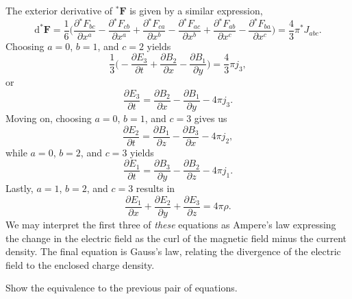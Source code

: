 \documentclass[../road-to-reality.tex]{subfiles}
\begin{document}
\begin{questions}
\begin{solution}
    The exterior derivative of ${}^*\mathbf{F}$ is given by a similar
    expression,
    \[
      \mathrm{d}^*\mathbf{F} = \frac{1}{6}\Big(\frac{\partial{^*F_{bc}}}{\partial{x^a}} -
      \frac{\partial{^*F_{cb}}}{\partial{x^a}} + \frac{\partial{^*F_{ca}}}{\partial{x^b}}
      - \frac{\partial{^*F_{ac}}}{\partial{x^b}} +
      \frac{\partial{^*F_{ab}}}{\partial{x^c}} -
      \frac{\partial{^*F_{ba}}}{\partial{x^c}}\Big) = \frac{4}{3}\pi^*J_{abc}.
    \]
    Choosing $a=0$, $b=1$, and $c=2$ yields
    \[
      \frac{1}{3}\Big(-\frac{\partial{E_3}}{\partial{t}} + \frac{\partial{B_2}}{\partial{x}} - \frac{\partial{B_1}}{\partial{y}}\Big) = \frac{4}{3}\pi{j_3},
    \]
    or
    \[
      \frac{\partial{E_3}}{\partial{t}} = \frac{\partial{B_2}}{\partial{x}} -
      \frac{\partial{B_1}}{\partial{y}} - 4\pi{j_3}.
    \]
    Moving on, choosing $a=0$, $b=1$, and $c=3$ gives us
    \[
      \frac{\partial{E_2}}{\partial{t}} = \frac{\partial{B_1}}{\partial{z}} -
      \frac{\partial{B_3}}{\partial{x}} -4\pi{j_2},
    \]
    while $a=0$, $b=2$, and $c=3$ yields
    \[
      \frac{\partial{E_1}}{\partial{t}} = \frac{\partial{B_3}}{\partial{y}} -
      \frac{\partial{B_2}}{\partial{z}} - 4\pi{j_1}.
    \]
    Lastly, $a=1$, $b=2$, and $c=3$ results in
    \[
      \frac{\partial{E_1}}{\partial{x}} + \frac{\partial{E_2}}{\partial{y}} +
      \frac{\partial{E_3}}{\partial{z}} = 4\pi\rho.
    \]
    We may interpret the first three of \textit{these} equations as Ampere's law
    expressing the change in the electric field as the curl of the magnetic field
    minus the current density. The final equation is Gauss's law, relating the
    divergence of the electric field to the enclosed charge density.
  \end{solution}

\question Show the equivalence to the previous pair of equations.


\end{questions}
\end{document}
